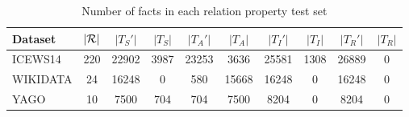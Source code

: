 \begin{table*}[htb]
\centering
\begin{minipage}{0.95\textwidth}
\centering
\caption{Number of facts in each relation property test set}
\vspace{-3mm}

\begin{tabular}{lc|cc|cc|cc|cc}\hline
Dataset & $|\mathcal{R}|$ & $|T_S'|$ & $|T_S|$ & $|T_A'|$ & $|T_A|$ & $|T_I'|$ & $|T_I|$ & $|T_R'|$ & $|T_R|$ \\ \hline
ICEWS14 & 220 & 22902 & 3987 & 23253 & 3636 & 25581 & 1308 & 26889 & 0 \\
WIKIDATA & 24 & 16248 & 0 & 580 & 15668 & 16248 & 0 & 16248 & 0 \\
YAGO & 10 & 7500 & 704 & 704 & 7500 & 8204 & 0 & 8204 & 0 \\
 \hline
\end{tabular}

\label{tab:relation_property_test_sets}
\end{minipage}
\end{table*}

